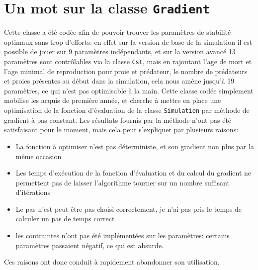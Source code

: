 \documentclass[12pt,a4paper,titlepage]{article}
\begin{document}
\section{Un mot sur la classe \texttt{Gradient}}

Cette classe a été codée afin de pouvoir trouver les paramètres de stabilité optimaux sans trop d'efforts: en effet sur la version de base de la simulation il est possible de jouer sur 9 paramètres indépendants, et sur la version avancé 13 paramètres sont contrôlables via la classe \texttt{Cst}, mais en rajoutant l'age de mort et l'age minimal de reproduction pour proie et prédateur, le nombre de prédateurs et proies présentes au début dans la simulation, cela nous amène jusqu'à 19 paramètres, ce qui n'est pas optimisable à la main. Cette classe codée simplement mobilise les acquis de première année, et cherche à mettre en place une optimisation de la fonction d'évaluation de la classe \texttt{Simulation} par méthode de gradient à pas constant. Les résultats fournis par la méthode n'ont pas été satisfaisant pour le moment, mais cela peut s'expliquer par plusieurs raisons:\begin{itemize}
\item La fonction à optimiser n'est pas déterministe, et son gradient non plus par la même occasion
\item Les temps d'exécution de la fonction d'évaluation et du calcul du gradient ne permettent pas de laisser l'algorithme tourner sur un nombre suffisant d'itérations
\item Le pas n'est peut être pas choisi correctement, je n'ai pas pris le temps de calculer un pas de temps correct
\item les contraintes n'ont pas été implémentées sur les paramètres: certains paramètres passaient négatif, ce qui est absurde.
\end{itemize} 
Ces raisons ont donc conduit à rapidement abandonner son utilisation.
\end{document}
